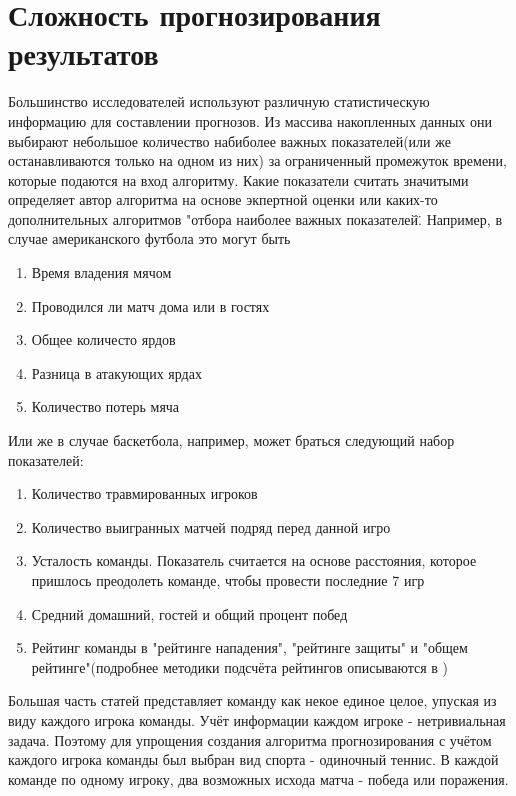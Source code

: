 \section{Сложность прогнозирования результатов}
 Большинство исследователей используют различную статистическую информацию для составлении прогнозов. Из массива накопленных данных они выбирают небольшое количество набиболее важных показателей(или же останавливаются только на одном из них) за ограниченный промежуток времени, которые подаются на вход алгоритму.
 Какие показатели считать значитыми определяет автор алгоритма на основе экпертной оценки или каких-то дополнительных алгоритмов "отбора наиболее важных показателей\".
 Например, в случае американского футбола\cite{Book02} это могут быть
 \begin{enumerate}
 	\item  Время владения мячом
 	\item Проводился ли матч дома или в гостях
 	\item Общее количесто ярдов
 	\item Разница в атакующих ярдах
 	\item Количество потерь мяча
 \end{enumerate}
Или же в случае баскетбола, например, может браться следующий набор показателей:
 \begin{enumerate}
	\item  Количество травмированных игроков
	\item Количество выигранных матчей подряд перед данной игро
	\item Усталость команды. Показатель считается на основе расстояния, которое пришлось преодолеть команде, чтобы провести последние 7 игр
	\item Средний домашний, гостей и общий процент побед
	\item Рейтинг команды в "рейтинге нападения", "рейтинге защиты" и "общем рейтинге"(подробнее методики подсчёта рейтингов описываются в \cite{Book03})
\end{enumerate}
Большая часть статей представляет команду как некое единое целое, упуская из виду каждого игрока команды. Учёт информации каждом игроке - нетривиальная задача.
Поэтому для упрощения создания алгоритма прогнозирования с учётом каждого игрока команды был выбран вид спорта - одиночный теннис. В каждой команде по одному игроку, два возможных исхода матча - победа или поражения.
